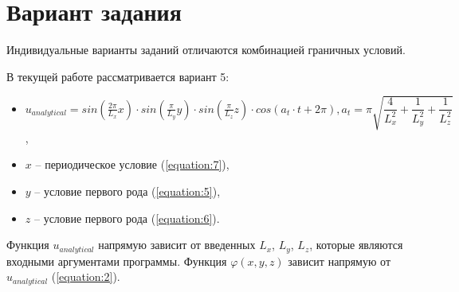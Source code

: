 \section{Вариант задания}
\label{sec:Chapter4} 
Индивидуальные варианты заданий отличаются комбинацией граничных условий.

В текущей работе рассматривается вариант 5:
\begin{itemize}
    \item $
        u_{analytical}
        =
        sin \left( \frac{2\pi}{L_x}x \right)
        \cdot
        sin \left( \frac{\pi}{L_y}y \right)
        \cdot
        sin \left( \frac{\pi}{L_z}z \right)
        \cdot
        cos \left( a_t \cdot t + 2\pi \right),
        a_t
        =
        \pi \sqrt{
            \dfrac{4}{L^2_x}
            +
            \dfrac{1}{L^2_y}
            +
            \dfrac{1}{L^2_z}
        }
    $,
    \item \(x\) -- периодическое условие (\ref{equation:7}),
    \item \(y\) -- условие первого рода (\ref{equation:5}),
    \item \(z\) -- условие первого рода (\ref{equation:6}).
\end{itemize}

Функция \(u_{analytical}\) напрямую зависит от введенных \(L_x\), \(L_y\), \(L_z\), которые являются входными аргументами программы.
Функция \(\varphi(x, y, z)\) зависит напрямую от \(u_{analytical}\) (\ref{equation:2}).